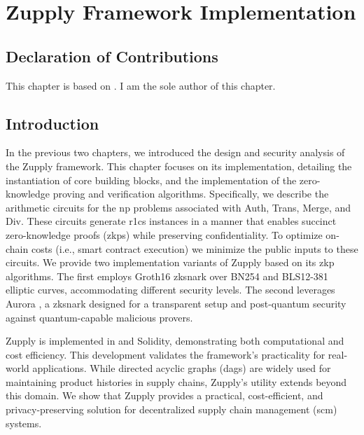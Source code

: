 \chapter{Zupply Framework Implementation}

\section*{Declaration of Contributions}
This chapter is based on \cite{Badakhshan2024Zupply}. I am the sole author of this chapter.

\section{Introduction}

In the previous two chapters, we introduced the design and security analysis of the Zupply framework. This chapter focuses on its implementation, detailing the 
instantiation of core building blocks, and the implementation of the zero-knowledge proving and verification algorithms. Specifically, we describe the arithmetic circuits for the \gls{np} problems associated with \textsf{Auth}, \textsf{Trans}, \textsf{Merge}, and \textsf{Div}. These circuits generate \gls{r1cs} instances in a manner that enables succinct zero-knowledge proofs (\gls{zkp}s) while preserving confidentiality. To optimize on-chain costs (i.e., smart contract execution) we minimize the public inputs to these circuits. 
We provide two implementation variants of Zupply based on its \gls{zkp} algorithms. The first employs Groth16 \cite{Groth2016} \gls{zksnark} over BN254 \cite{BNcurve} and BLS12-381 \cite{BLS_curve2003} elliptic curves, accommodating different security levels. The second leverages Aurora \cite{Aurora}, a \gls{zksnark} designed for a transparent setup and post-quantum security against quantum-capable malicious provers.

Zupply is implemented in \CC and Solidity, demonstrating both computational and cost efficiency. This development validates the framework's practicality for real-world applications. While directed acyclic graphs (\gls{dag}s) are widely used for maintaining product histories in supply chains, Zupply's utility extends beyond this domain. We show that Zupply provides a practical, cost-efficient, and privacy-preserving solution for decentralized supply chain management (\gls{scm}) systems.

